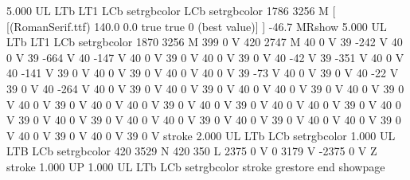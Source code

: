 5.000 UL
LTb
LT1
LCb setrgbcolor
LCb setrgbcolor
1786 3256 M
[ [(RomanSerif.ttf) 140.0 0.0 true true 0 (best value)]
] -46.7 MRshow
5.000 UL
LTb
LT1
LCb setrgbcolor
1870 3256 M
399 0 V
420 2747 M
40 0 V
39 -242 V
40 0 V
39 -664 V
40 -147 V
40 0 V
39 0 V
40 0 V
39 0 V
40 -42 V
39 -351 V
40 0 V
40 -141 V
39 0 V
40 0 V
39 0 V
40 0 V
40 0 V
39 -73 V
40 0 V
39 0 V
40 -22 V
39 0 V
40 -264 V
40 0 V
39 0 V
40 0 V
39 0 V
40 0 V
40 0 V
39 0 V
40 0 V
39 0 V
40 0 V
39 0 V
40 0 V
40 0 V
39 0 V
40 0 V
39 0 V
40 0 V
40 0 V
39 0 V
40 0 V
39 0 V
40 0 V
39 0 V
40 0 V
40 0 V
39 0 V
40 0 V
39 0 V
40 0 V
40 0 V
39 0 V
40 0 V
39 0 V
40 0 V
39 0 V
stroke
2.000 UL
LTb
LCb setrgbcolor
1.000 UL
LTB
LCb setrgbcolor
420 3529 N
420 350 L
2375 0 V
0 3179 V
-2375 0 V
Z stroke
1.000 UP
1.000 UL
LTb
LCb setrgbcolor
stroke
grestore
end
showpage
